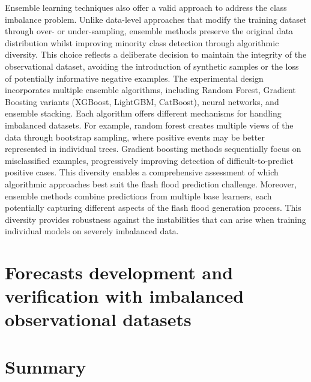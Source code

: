 Ensemble  learning techniques also offer a valid approach to address the class imbalance problem. Unlike data-level approaches that modify the training dataset through over- or under-sampling, ensemble methods preserve the original data distribution whilst improving minority class detection through algorithmic diversity. This choice reflects a deliberate decision to maintain the integrity of the observational dataset, avoiding the introduction of synthetic samples or the loss of potentially informative negative examples. The experimental design incorporates multiple ensemble algorithms, including Random Forest, Gradient Boosting variants (XGBoost, LightGBM, CatBoost), neural networks, and ensemble stacking. Each algorithm offers different mechanisms for handling imbalanced datasets. For example, random forest creates multiple views of the data through bootstrap sampling, where positive events may be better represented in individual trees. Gradient boosting methods sequentially focus on misclassified examples, progressively improving detection of difficult-to-predict positive cases. This diversity enables a comprehensive assessment of which algorithmic approaches best suit the flash flood prediction challenge. Moreover, ensemble methods combine predictions from multiple base learners, each potentially capturing different aspects of the flash flood generation process. This diversity provides robustness against the instabilities that can arise when training individual models on severely imbalanced data.


\section{Forecasts development and verification with imbalanced observational datasets}
\label{experimental_design_model_dev_imbalanced_data}





\section{Summary}

